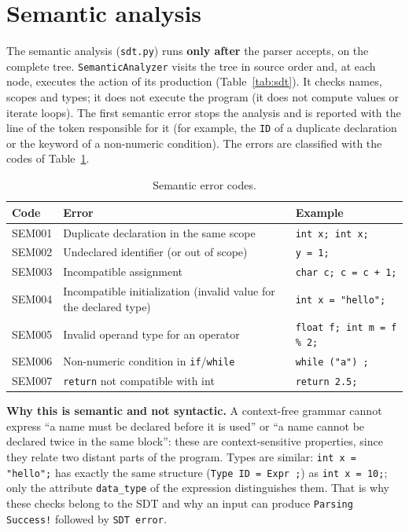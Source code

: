 \documentclass[11pt,letterpaper]{article}
\let\oldsection\section
\renewcommand{\section}{\needspace{8\baselineskip}\oldsection}
\newcommand{\tok}[1]{\texttt{#1}}
\newcommand{\ok}[1]{\textcolor{okgreen}{\texttt{#1}}}
\newcommand{\bad}[1]{\textcolor{errred}{\texttt{#1}}}
\begin{document}
\section{Semantic analysis}

The semantic analysis (\texttt{sdt.py}) runs \textbf{only after} the parser
accepts, on the complete tree. \texttt{SemanticAnalyzer} visits the tree in
source order and, at each node, executes the action of its production
(Table~\ref{tab:sdt}). It checks names, scopes and types; it does not execute
the program (it does not compute values or iterate loops). The first semantic
error stops the analysis and is reported with the line of the token
responsible for it (for example, the \tok{ID} of a duplicate declaration or
the keyword of a non-numeric condition). The errors are classified with the
codes of Table~\ref{tab:sem}.

\begin{table}[!htbp]
\centering
\caption{Semantic error codes.}
\label{tab:sem}
\small
\begin{tabularx}{\linewidth}{@{}lXl@{}}
\toprule
\textbf{Code} & \textbf{Error} & \textbf{Example} \\
\midrule
SEM001 & Duplicate declaration in the same scope & \texttt{int x; int x;} \\
SEM002 & Undeclared identifier (or out of scope)  & \texttt{y = 1;} \\
SEM003 & Incompatible assignment                  & \texttt{char c; c = c + 1;} \\
SEM004 & Incompatible initialization (invalid value for the declared type) & \texttt{int x = "hello";} \\
SEM005 & Invalid operand type for an operator      & \texttt{float f; int m = f \% 2;} \\
SEM006 & Non-numeric condition in \texttt{if}/\texttt{while} & \texttt{while ("a") ;} \\
SEM007 & \texttt{return} not compatible with int   & \texttt{return 2.5;} \\
\bottomrule
\end{tabularx}
\end{table}

\textbf{Why this is semantic and not syntactic.} A context-free grammar
cannot express ``a name must be declared before it is used'' or ``a name
cannot be declared twice in the same block'': these are context-sensitive
properties, since they relate two distant parts of the program. Types are
similar: \texttt{int x = "hello";} has exactly the same structure
(\texttt{Type ID = Expr ;}) as \texttt{int x = 10;}; only the attribute
\texttt{data\_type} of the expression distinguishes them. That is why these
checks belong to the SDT and why an input can produce
\ok{Parsing Success!} followed by \bad{SDT error}.
\end{document}
